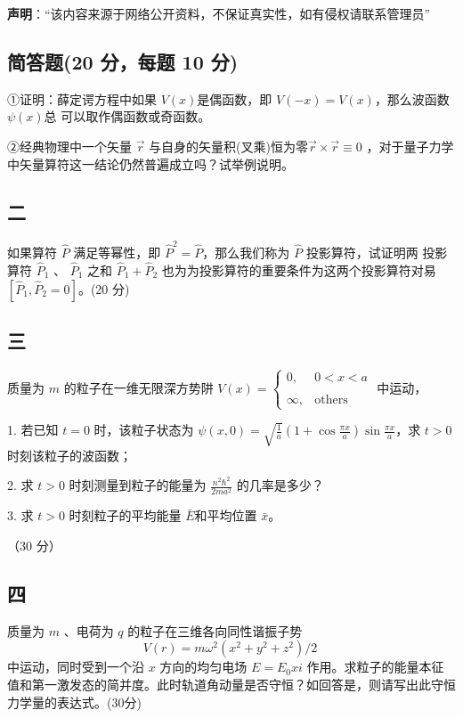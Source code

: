 
\textbf{声明}：“该内容来源于网络公开资料，不保证真实性，如有侵权请联系管理员”

\subsection{简答题(20 分，每题 10 分)}
①证明：薛定谔方程中如果 $V(x)$是偶函数，即 $V(-x)=V(x)$，那么波函数 $\psi(x)$总
可以取作偶函数或奇函数。

②经典物理中一个矢量 $\vec r$ 与自身的矢量积(叉乘)恒为零$\vec r \times \vec r\equiv
0$   ，对于量子力学
中矢量算符这一结论仍然普遍成立吗？试举例说明。

\subsection{二}
如果算符 $\hat{P}$ 满足等幂性，即 $\hat{P}^2 = \hat{P}$，那么我们称为 $\hat{P}$ 投影算符，试证明两
投影算符 $\hat{P}_1$ 、 $\hat{P}_1$ 之和 $\hat{P}_1+\hat{P}_2$ 也为为投影算符的重要条件为这两个投影算符对易$[\hat{P}_1,\hat{P}_2=0]$。(20 分)

\subsection{三}
质量为 $m$ 的粒子在一维无限深方势阱 $ V(x) = \begin{cases} 0, & 0 < x < a \\\\ \infty, & \text{others} \end{cases} $ 中运动，

1. 若已知 $ t = 0$ 时，该粒子状态为 $\psi(x,0) = \sqrt{\frac{1}{a}}(1 + \cos \frac{\pi x}{a})\sin \frac{\pi x}{a}$，求 $t > 0 $ 时刻该粒子的波函数；

2. 求 $ t > 0 $ 时刻测量到粒子的能量为 $\frac{n^2 \hbar^2}{2 m a^2}$ 的几率是多少？

3. 求 $t > 0 $ 时刻粒子的平均能量 $\bar{E}$和平均位置 $\bar{x}$。

（30 分）

\subsection{四}
质量为 $m$ 、电荷为 $q$ 的粒子在三维各向同性谐振子势 $$V(r) = m\omega^2(x^2 + y^2 + z^2)/2~$$ 中运动，同时受到一个沿 $x$ 方向的均匀电场 $E = E_0 x i$ 作用。求粒子的能量本征值和第一激发态的简并度。此时轨道角动量是否守恒？如回答是，则请写出此守恒力学量的表达式。(30分)

